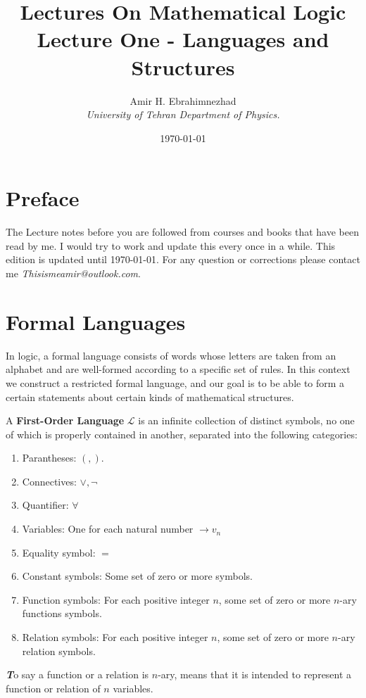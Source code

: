 \documentclass[9pt,a4paper, twocolumn]{article}
\title{Lectures On Mathematical Logic\\ \large Lecture One - Languages and Structures}
\date{\today}
\author{Amir H. Ebrahimnezhad \\ \small \textit{University of Tehran Department of Physics.}}
\newenvironment{callout}
	{\begin{calloutbox}\color{charcoal}\textbf\textit}
	{\end{calloutbox}}
\newcommand{\curveL}{\mathcal{L}}
\begin{document}
    \maketitle
    \section*{Preface}
    The Lecture notes before you are followed from courses and books that have been read by me. I would try to work and update this every once in a while. This edition is updated until \today. For any question or corrections please contact me \textit{Thisismeamir@outlook.com}.
    \tableofcontents
    \newpage
    \section{Formal Languages}
        In logic, a formal language consists of words whose letters are taken from an alphabet and are well-formed according to a specific set of rules. In this context we construct a restricted formal language, and our goal is to be able to form a certain statements about certain kinds of mathematical structures.
        \begin{define}
            A \textbf{First-Order Language} $\curveL$ is an infinite collection of distinct symbols, no one of which is properly contained in another, separated into the following categories:
            \begin{enumerate}
                \item Parantheses: $(,)$.
                \item Connectives: $\lor, \neg$
                \item Quantifier: $\forall$
                \item Variables: One for each natural number $\rightarrow v_n$
                \item Equality symbol: $=$
                \item Constant symbols: Some set of zero or more symbols.
                \item Function symbols: For each positive integer $n$, some set of zero or more $n$-ary functions symbols.
                \item Relation symbols: For each positive integer $n$, some set of zero or more $n$-ary relation symbols.
            \end{enumerate}
        \end{define}
        \begin{callout}
            To say a function or a relation is $n$-ary, means that it is intended to represent a function or relation of $n$ variables.
        \end{callout}
\end{document}
